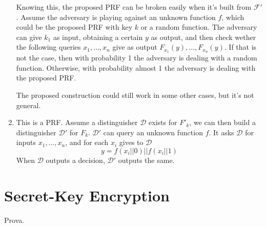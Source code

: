\documentclass{article}
\newcommand{\distinguisher}{\mathcal{D}}
\newcommand{\prf}{\mathcal{F}}
\begin{document}
\begin{enumerate}
		Knowing this, the proposed PRF can be broken easily when it's built from $\prf'$.
		Assume the adversary is playing against an unknown function $f$, which could be the proposed PRF with key $k$ or a random function.
		The adversary can give $k_1$ as input, obtaining a certain $y$ as output, and then check wether the following queries $x_1, \dots, x_n$ give as output $F_{x_1}(y), \dots, F_{x_n}(y)$.
		If that is not the case, then with probability 1 the adversary is dealing with a random function.
		Otherwise, with probability almost 1 the adversary is dealing with the proposed PRF.

		The proposed construction could still work in some other cases, but it's not general.
	\item This is a PRF.
		Assume a distinguisher $\distinguisher$ exists for $F'_k$, we can then build a distinguisher $\distinguisher'$ for $F_k$.
		$\distinguisher'$ can query an unknown function $f$.
		It asks $\distinguisher$ for inputs $x_1, \dots, x_n$, and for each $x_i$ gives to $\distinguisher$
		\[
			y = f(x_i || 0) || f(x_i || 1)
		\]
		When $\distinguisher$ outputs a decision, $\distinguisher'$ outputs the same.
\end{enumerate}

\section{Secret-Key Encryption}

Prova.
\end{document}
